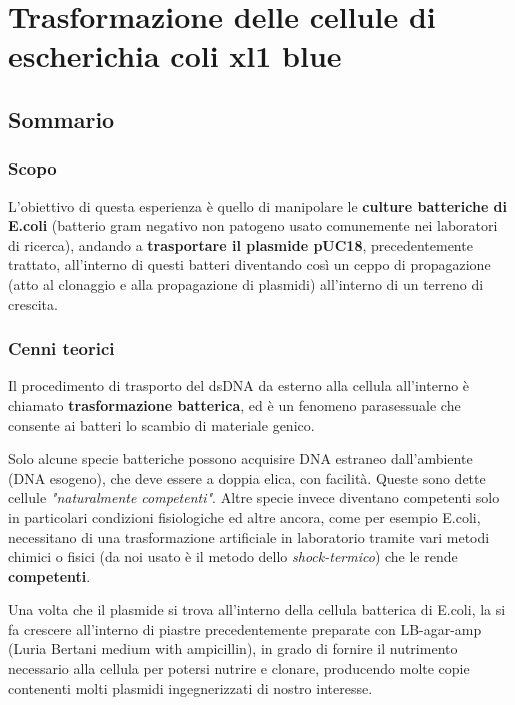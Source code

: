 \chapter{Trasformazione delle cellule di escherichia coli xl1 blue}

\vspace{0.6cm}

\section{Sommario}

\subsection{Scopo}

L'obiettivo di questa esperienza è quello di manipolare le \textbf{culture batteriche di E.coli}
(batterio gram negativo non patogeno usato comunemente nei laboratori di ricerca),
andando a \textbf{trasportare il plasmide pUC18}, precedentemente trattato,
all'interno di questi batteri diventando cos\`i un ceppo di propagazione
(atto al clonaggio e alla propagazione di plasmidi) all'interno di un terreno di crescita.

\subsection{Cenni teorici}

Il procedimento di trasporto del dsDNA da esterno alla cellula all'interno è chiamato
\textbf{trasformazione batterica}, ed è un fenomeno parasessuale che consente ai batteri
lo scambio di materiale genico.

Solo alcune specie batteriche possono acquisire DNA estraneo dall'ambiente (DNA esogeno),
che deve essere a doppia elica, con facilità.
Queste sono dette cellule \textit{"naturalmente competenti"}.
Altre specie invece diventano competenti solo in particolari condizioni fisiologiche
ed altre ancora, come per esempio E.coli, necessitano di una trasformazione artificiale in
laboratorio tramite vari metodi chimici o fisici
(da noi usato è il metodo dello \textit{shock-termico}) che le rende \textbf{competenti}.

Una volta che il plasmide si trova all'interno della cellula batterica di E.coli,
la si fa crescere all'interno di piastre precedentemente preparate con LB-agar-amp
(Luria Bertani medium with ampicillin), in grado di fornire il nutrimento necessario
alla cellula per potersi nutrire e clonare,
producendo molte copie contenenti molti plasmidi ingegnerizzati di nostro interesse.

